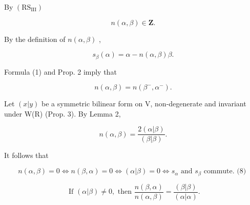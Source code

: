 By \((\mathrm{RS}_{\mathrm{III}})\)

\[
n (\alpha , \beta) \in \mathbf {Z}.\tag{4}
\]

By the definition of \(n(\alpha, \beta)\) ,

\[
s _ {\beta} (\alpha) = \alpha - n (\alpha , \beta) \beta .\tag{5}
\]

Formula (1) and Prop. 2 imply that

\[
n (\alpha , \beta) = n \left(\beta^ {-}, \alpha^ {-}\right).\tag{6}
\]

Let \((x|y)\) be a symmetric bilinear form on V, non-degenerate and invariant under W(R) (Prop. 3). By Lemma 2,

\[
n (\alpha , \beta) = \frac {2 (\alpha | \beta)}{(\beta | \beta)}.\tag{7}
\]

It follows that

\[
n (\alpha , \beta) = 0 \Longleftrightarrow n (\beta , \alpha) = 0 \Longleftrightarrow (\alpha | \beta) = 0 \Longleftrightarrow s _ {\alpha} \text {   and   } s _ {\beta} \text {   commute.   (8) }
\]

\[
\text {   If   } (\alpha | \beta) \neq 0, \text {   then   } \frac {n (\beta , \alpha)}{n (\alpha , \beta)} = \frac {(\beta | \beta)}{(\alpha | \alpha)}.\tag{9}
\]

